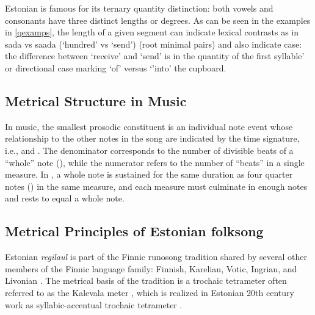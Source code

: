 Estonian is famous for its ternary quantity distinction: both vowels and consonants have three distinct lengths or degrees. As can be seen in the examples in \ref{qexamps}, the length of a given segment can indicate lexical contrasts as in sada vs saada (`hundred' vs `send') (root minimal pairs) and also indicate case: the difference between `receive' and `send' is in the quantity of the first syllable' or directional case marking `of' versus `'into' the cupboard. 
%
%
\subsection{Metrical Structure in Music} 
In music, the smallest prosodic constituent is an individual note event whose relationship to the other notes in the song are indicated by the time signature, i.e.,  and . The denominator corresponds to the number of divisible beats of a ``whole'' note (\semibreve), while the numerator refers to the number of ``beats'' in a single measure. In  , a whole note is sustained for the same duration as  four quarter notes (\crotchet) in the same measure, and each measure must culminate in enough notes and rests to equal a whole note. 
 

\subsection{Metrical Principles of Estonian folksong}

Estonian {\it regilaul} is part of the Finnic runosong tradition shared by several other members of the Finnic language family: Finnish, Karelian, Votic, Ingrian, and Livonian \citep{rossLehiste2001}. The metrical basis of the tradition is a trochaic tetrameter often referred to as the Kalevala meter \citep{oras2019}, which is realized in Estonian 20th century work as syllabic-accentual trochaic tetrameter \citep{lotmanLotman2013}. 


